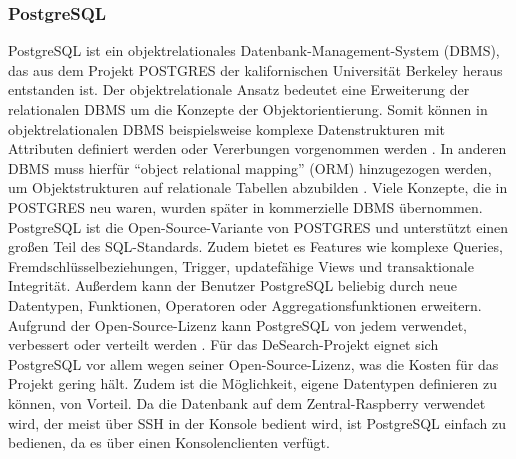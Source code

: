 \subsubsection{PostgreSQL}
PostgreSQL ist ein objektrelationales Datenbank-Management-System (DBMS), das aus dem Projekt POSTGRES der kalifornischen Universität Berkeley heraus entstanden ist. Der objektrelationale Ansatz bedeutet eine Erweiterung der relationalen DBMS um die Konzepte der Objektorientierung. Somit können in objektrelationalen DBMS beispielsweise komplexe Datenstrukturen mit Attributen definiert werden oder Vererbungen vorgenommen werden \citep[Vgl.][S. 135f.]{datenbanken}. In anderen DBMS muss hierfür \enquote{object relational mapping} (ORM) hinzugezogen werden, um Objektstrukturen auf relationale Tabellen abzubilden \citep[Vgl.][S. 426]{balzert}. Viele Konzepte, die in POSTGRES neu waren, wurden später in kommerzielle DBMS übernommen. PostgreSQL ist die Open-Source-Variante von POSTGRES und unterstützt einen großen Teil des SQL-Standards. Zudem bietet es Features wie komplexe Queries, Fremdschlüsselbeziehungen, Trigger, updatefähige Views und transaktionale Integrität. Außerdem kann der Benutzer PostgreSQL beliebig durch neue Datentypen, Funktionen, Operatoren oder Aggregationsfunktionen erweitern. Aufgrund der Open-Source-Lizenz kann PostgreSQL von jedem verwendet, verbessert oder verteilt werden
\citep[Vgl.][preface, S. lxvi]{postgres}. Für das DeSearch-Projekt eignet sich PostgreSQL vor allem wegen seiner Open-Source-Lizenz, was die Kosten für das Projekt gering hält. Zudem ist die Möglichkeit, eigene Datentypen definieren zu können, von Vorteil. Da die Datenbank auf dem Zentral-Raspberry verwendet wird, der meist über SSH in der Konsole bedient wird, ist PostgreSQL einfach zu bedienen, da es über einen Konsolenclienten verfügt.


